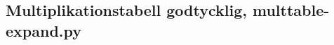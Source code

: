 \begin{frame}
  
\end{frame}

\subsection{Multiplikationstabell godtycklig, multtable-expand.py}

\begin{frame}
  
\end{frame}

\begin{frame}
  
\end{frame}

